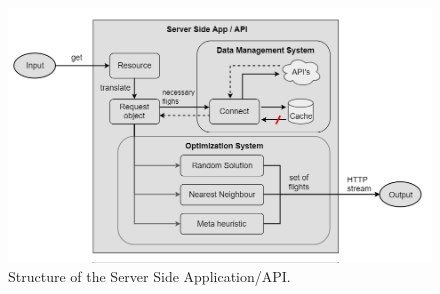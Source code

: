 \begin{figure}[htpb]
  \centering
  \includegraphics[width=\textwidth]{./Figures/system_implementation/api_structure.png}
  \caption{Structure of the Server Side Application/API.}
  \label{fig:api_structure}  
\end{figure}